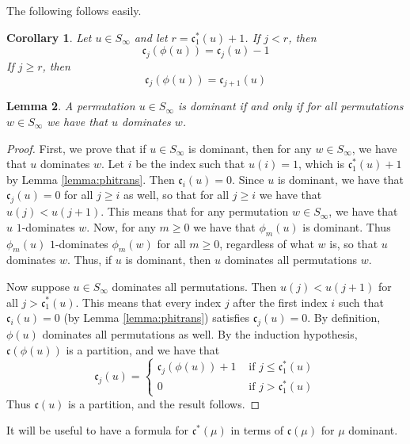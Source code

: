 \documentclass{amsart}
\newtheorem{lemma}{Lemma}[subsection]
\newtheorem{corollary}[lemma]{Corollary}
\theoremstyle{definition}
\theoremstyle{remark}
\numberwithin{equation}{subsection}
\newcommand{\code}{\mathfrak{c}}
\begin{document}
The following follows easily.

\begin{corollary} \label{corollary:subtractcode}
	Let $u\in S_\infty$ and let $r=\code_1^*(u)+1$. If $j<r$, then
	$$\code_j(\phi(u))=\code_j(u)-1$$
	If $j\geq r$, then
	$$\code_j(\phi(u))=\code_{j+1}(u)$$
\end{corollary}




\begin{lemma} \label{lemma:domdom}
A permutation $u\in S_\infty$ is dominant if and only if for all permutations $w\in S_\infty$ we have that $u$ dominates $w$.
\end{lemma}
\begin{proof}
First, we prove that if $u\in S_\infty$ is dominant, then for any $w\in S_\infty$, we have that $u$ dominates $w$. Let $i$ be the index such that $u(i)=1$, which is $\code_1^*(u)+1$ by Lemma \ref{lemma:phitrans}. Then $\code_i(u)=0$. Since $u$ is dominant, we have that $\code_j(u)=0$ for all $j\geq i$ as well, so that for all $j\geq i$ we have that $u(j)<u(j+1)$. This means that for any permutation $w\in S_\infty$, we have that $u$ $1$-dominates $w$. Now, for any $m\geq 0$ we have that $\phi_m(u)$ is dominant. Thus $\phi_m(u)$ $1$-dominates $\phi_m(w)$ for all $m\geq 0$, regardless of what $w$ is, so that $u$ dominates $w$. Thus, if $u$ is dominant, then $u$ dominates all permutations $w$.

Now suppose $u\in S_\infty$ dominates all permutations. Then $u(j)<u(j+1)$ for all $j>\code_1^*(u)$. This means that every index $j$ after the first index $i$ such that $\code_i(u)=0$ (by Lemma \ref{lemma:phitrans}) satisfies $\code_j(u)=0$. By definition, $\phi(u)$ dominates all permutations as well. By the induction hypothesis, $\code(\phi(u))$ is a partition, and we have that 
$$\code_j(u)=\begin{cases}
\code_j(\phi(u))+1&\mbox{ if }j\leq\code_1^*(u)\\
0&\mbox{ if }j>\code_1^*(u)
\end{cases}$$
Thus $\code(u)$ is a partition, and the result follows.
\end{proof}


It will be useful to have a formula for $\code^*(\mu)$ in terms of $\code(\mu)$ for $\mu$ dominant.
\end{document}
